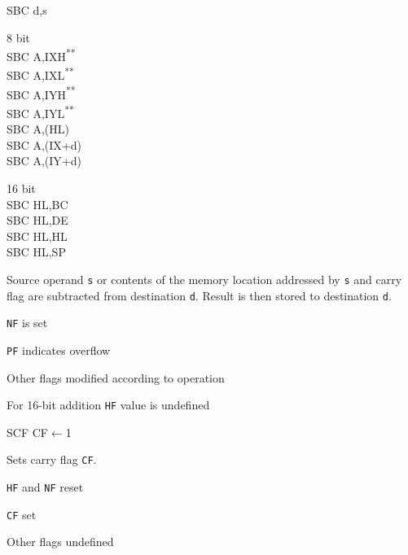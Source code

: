 \documentclass[twoside,openright,a4paper]{book}
\newcommand{\UNDOC}{\textnormal{\textsuperscript{**}}}
\begin{document}
\begin{basedescript}{
	\desclabelstyle{\multilinelabel}
	\desclabelwidth{3cm}}
\begin{detailitem}{SBC d,s}
\begin{DetailVariants}
			\columnbreak

			\textnormal{8 bit}\\
			SBC A,IXH\UNDOC\\
			SBC A,IXL\UNDOC\\
			SBC A,IYH\UNDOC\\
			SBC A,IYL\UNDOC\\
			SBC A,(HL)\\
			SBC A,(IX+d)\\
			SBC A,(IY+d)

			\columnbreak

			\textnormal{16 bit}\\
			SBC HL,BC\\
			SBC HL,DE\\
			SBC HL,HL\\
			SBC HL,SP\\
		\end{DetailVariants}
		
		Source operand {\tt s} or contents of the memory location addressed by {\tt s} and carry flag are subtracted from destination {\tt d}. Result is then stored to destination {\tt d}.

		\begin{DetailEffects}
			\item {\tt NF} is set
			\item {\tt PF} indicates overflow
			\item Other flags modified according to operation
			\item For 16-bit addition {\tt HF} value is undefined
		\end{DetailEffects}
						
		\begin{DetailTiming}
		\end{DetailTiming}

	\end{detailitem}

	\begin{detailitem}{SCF}
		{CF$\leftarrow$1}

		Sets carry flag {\tt CF}.

		\begin{DetailEffects}
			\item {\tt HF} and {\tt NF} reset
			\item {\tt CF} set
			\item Other flags undefined
		\end{DetailEffects}
						

\end{detailitem}
\end{basedescript}
\end{document}
